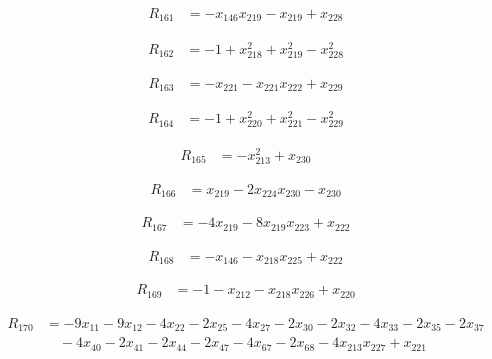 \begin{align*}
R_{161} &= -x_{146} x_{219} -x_{219} +x_{228}
\end{align*}

\begin{align*}
R_{162} &= -1 +x_{218}^{2} +x_{219}^{2} -x_{228}^{2}
\end{align*}

\begin{align*}
R_{163} &= -x_{221} -x_{221} x_{222} +x_{229}
\end{align*}

\begin{align*}
R_{164} &= -1 +x_{220}^{2} +x_{221}^{2} -x_{229}^{2}
\end{align*}

\begin{align*}
R_{165} &= -x_{213}^{2} +x_{230}
\end{align*}

\begin{align*}
R_{166} &= x_{219} -2 x_{224} x_{230} -x_{230}
\end{align*}

\begin{align*}
R_{167} &= -4 x_{219} -8 x_{219} x_{223} +x_{222}
\end{align*}

\begin{align*}
R_{168} &= -x_{146} -x_{218} x_{225} +x_{222}
\end{align*}

\begin{align*}
R_{169} &= -1 -x_{212} -x_{218} x_{226} +x_{220}
\end{align*}

\begin{align*}
R_{170} &= -9 x_{11} -9 x_{12} -4 x_{22} -2 x_{25} -4 x_{27} -2 x_{30} -2 x_{32} -4 x_{33} -2 x_{35} -2 x_{37} \\
&\quad -4 x_{40} -2 x_{41} -2 x_{44} -2 x_{47} -4 x_{67} -2 x_{68} -4 x_{213} x_{227} +x_{221}
\end{align*}

